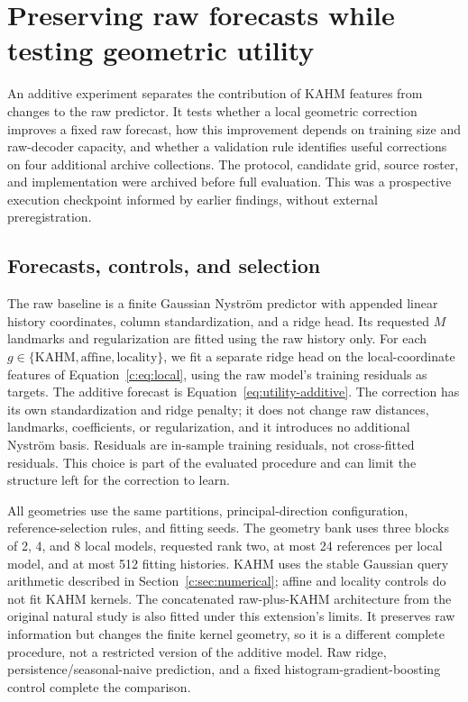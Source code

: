 \section{Preserving raw forecasts while testing geometric utility}
\label{sec:utility-extension}

An additive experiment separates the contribution of KAHM features
from changes to the raw predictor. It tests whether a local geometric
correction improves a fixed raw forecast, how this improvement depends
on training size and raw-decoder capacity, and whether a validation
rule identifies useful corrections on four additional archive collections.
The protocol, candidate grid, source roster, and implementation were
archived before full evaluation. This was a prospective execution
checkpoint informed by earlier findings, without external preregistration.

\subsection{Forecasts, controls, and selection}
\label{sec:utility-models}

The raw baseline is a finite Gaussian Nystr\"om predictor with
appended linear history coordinates, column standardization, and a ridge
head. Its requested $M$ landmarks and regularization are fitted using the raw history
only. For each $g\in\{\mathrm{KAHM},\mathrm{affine},\mathrm{locality}\}$,
we fit a separate ridge head on the local-coordinate features of
Equation~\eqref{c:eq:local}, using the raw model's training residuals as
targets. The additive forecast is Equation~\eqref{eq:utility-additive}.
The correction has its own standardization and ridge penalty; it does not
change raw distances, landmarks, coefficients, or regularization, and it
introduces no additional Nystr\"om basis. Residuals are in-sample training
residuals, not cross-fitted residuals. This choice is part of the evaluated
procedure and can limit the structure left for the correction to learn.

All geometries use the same partitions, principal-direction configuration,
reference-selection rules, and fitting seeds. The geometry bank uses
three blocks of 2, 4, and 8 local models, requested rank two, at most 24
references per local model, and at most 512 fitting histories. KAHM uses
the stable Gaussian query arithmetic described in
Section~\ref{c:sec:numerical}; affine and locality controls do not fit KAHM
kernels. The concatenated raw-plus-KAHM architecture from the original
natural study is also fitted under this extension's limits. It preserves
raw information but changes the finite kernel geometry, so it is a
different complete procedure, not a restricted version of the additive
model. Raw ridge, persistence/seasonal-naive prediction, and a fixed
histogram-gradient-boosting control complete the comparison.

